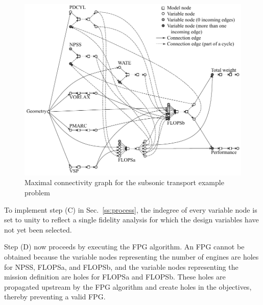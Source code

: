 	\begin{figure}[htb!]
	  \begin{center}
		\includegraphics[width=6in]{images/MCG_edit_holes}
	  \end{center}
	  \caption{Maximal connectivity graph for the subsonic transport example problem}
	\label{f:MCG holes}
	\end{figure}

To implement step (C) in Sec.~\ref{ss:process}, the indegree of every variable node is set to unity to reflect a single fidelity analysis for which the design variables have not yet been selected.

Step (D) now proceeds by executing the FPG algorithm. 
An FPG cannot be obtained because the variable nodes representing the number of engines are holes for NPSS, FLOPSa, and FLOPSb, and the variable nodes representing the mission definition are holes for FLOPSa and FLOPSb. 
These holes are propagated upstream by the FPG algorithm and create holes in the objectives, thereby preventing a valid FPG.

